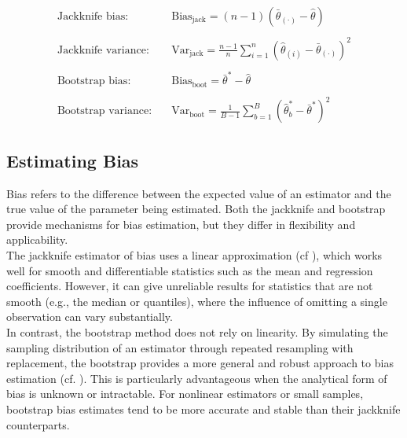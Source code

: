 \documentclass[aodsor,preprint]{imsart}
\numberwithin{equation}{section}
\theoremstyle{plain}
\begin{document}
\begin{align*}
\text{Jackknife bias:} \quad & \text{Bias}_{\text{jack}} = (n - 1)(\bar{\theta}_{(\cdot)} - \hat{\theta}) \\\\
\text{Jackknife variance:} \quad & \text{Var}_{\text{jack}} = \frac{n - 1}{n} \sum_{i=1}^n \left( \hat{\theta}_{(i)} - \bar{\theta}_{(\cdot)} \right)^2 \\\\
\text{Bootstrap bias:} \quad & \text{Bias}_{\text{boot}} = \bar{\theta}^* - \hat{\theta} \\\\
\text{Bootstrap variance:} \quad & \text{Var}_{\text{boot}} = \frac{1}{B - 1} \sum_{b=1}^B \left( \hat{\theta}_b^* - \bar{\theta}^* \right)^2
\end{align*}



\subsection{Estimating Bias}

Bias refers to the difference between the expected value of an estimator and the true value of the parameter being estimated. Both the jackknife and bootstrap provide mechanisms for bias estimation, but they differ in flexibility and applicability. \\

The jackknife estimator of bias uses a linear approximation (cf \cite{tukey1958bias,efron1982jackknife,shao1995jackknife}), which works well for smooth and differentiable statistics such as the mean and regression coefficients. However, it can give unreliable results for statistics that are not smooth (e.g., the median or quantiles), where the influence of omitting a single observation can vary substantially. \\

In contrast, the bootstrap method does not rely on linearity. By simulating the sampling distribution of an estimator through repeated resampling with replacement, the bootstrap provides a more general and robust approach to bias estimation (cf. \cite{efron1979,efron1993introduction,davison1997bootstrap}). This is particularly advantageous when the analytical form of bias is unknown or intractable. For nonlinear estimators or small samples, bootstrap bias estimates tend to be more accurate and stable than their jackknife counterparts. \\
\end{document}
